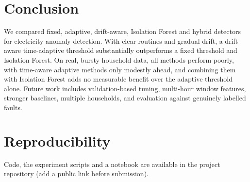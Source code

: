 \documentclass[conference]{IEEEtran}
\begin{document}
\section{Conclusion}
We compared fixed, adaptive, drift-aware, Isolation Forest and hybrid detectors for electricity anomaly detection. With clear routines and gradual drift, a drift-aware time-adaptive threshold substantially outperforms a fixed threshold and Isolation Forest. On real, bursty household data, all methods perform poorly, with time-aware adaptive methods only modestly ahead, and combining them with Isolation Forest adds no measurable benefit over the adaptive threshold alone. Future work includes validation-based tuning, multi-hour window features, stronger baselines, multiple households, and evaluation against genuinely labelled faults.

\section*{Reproducibility}
Code, the experiment scripts and a notebook are available in the project repository (add a public link before submission).
\end{document}
